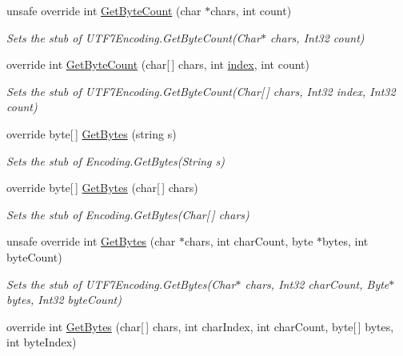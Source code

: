 \begin{DoxyCompactItemize}
unsafe override int \hyperlink{class_system_1_1_text_1_1_fakes_1_1_stub_u_t_f7_encoding_a75d02fc49a0d5817bf72bc135a326d1a}{Get\-Byte\-Count} (char $\ast$chars, int count)
\begin{DoxyCompactList}\small\item\em Sets the stub of U\-T\-F7\-Encoding.\-Get\-Byte\-Count(\-Char$\ast$ chars, Int32 count)\end{DoxyCompactList}\item 
override int \hyperlink{class_system_1_1_text_1_1_fakes_1_1_stub_u_t_f7_encoding_afb2271218af03f11aeda5efb555c46c2}{Get\-Byte\-Count} (char\mbox{[}$\,$\mbox{]} chars, int \hyperlink{jquery-1_810_82-vsdoc_8js_a75bb12d1f23302a9eea93a6d89d0193e}{index}, int count)
\begin{DoxyCompactList}\small\item\em Sets the stub of U\-T\-F7\-Encoding.\-Get\-Byte\-Count(\-Char\mbox{[}$\,$\mbox{]} chars, Int32 index, Int32 count)\end{DoxyCompactList}\item 
override byte\mbox{[}$\,$\mbox{]} \hyperlink{class_system_1_1_text_1_1_fakes_1_1_stub_u_t_f7_encoding_a8d35048164c83852219ba6f76c4b32b0}{Get\-Bytes} (string s)
\begin{DoxyCompactList}\small\item\em Sets the stub of Encoding.\-Get\-Bytes(\-String s)\end{DoxyCompactList}\item 
override byte\mbox{[}$\,$\mbox{]} \hyperlink{class_system_1_1_text_1_1_fakes_1_1_stub_u_t_f7_encoding_a95b797961e20bcd865f078d9218505cb}{Get\-Bytes} (char\mbox{[}$\,$\mbox{]} chars)
\begin{DoxyCompactList}\small\item\em Sets the stub of Encoding.\-Get\-Bytes(\-Char\mbox{[}$\,$\mbox{]} chars)\end{DoxyCompactList}\item 
unsafe override int \hyperlink{class_system_1_1_text_1_1_fakes_1_1_stub_u_t_f7_encoding_a2823806c6dcb38e5cb92046705fa867f}{Get\-Bytes} (char $\ast$chars, int char\-Count, byte $\ast$bytes, int byte\-Count)
\begin{DoxyCompactList}\small\item\em Sets the stub of U\-T\-F7\-Encoding.\-Get\-Bytes(\-Char$\ast$ chars, Int32 char\-Count, Byte$\ast$ bytes, Int32 byte\-Count)\end{DoxyCompactList}\item 
override int \hyperlink{class_system_1_1_text_1_1_fakes_1_1_stub_u_t_f7_encoding_a81cf0414ab7cbbeddff50a695b11db36}{Get\-Bytes} (char\mbox{[}$\,$\mbox{]} chars, int char\-Index, int char\-Count, byte\mbox{[}$\,$\mbox{]} bytes, int byte\-Index)

\end{DoxyCompactItemize}
